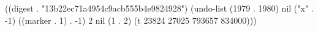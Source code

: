 
((digest . "13b22ec71a4954c9acb555b4e9824928") (undo-list (1979 . 1980) nil ("x" . -1) ((marker . 1) . -1) 2 nil (1 . 2) (t 23824 27025 793657 834000)))
